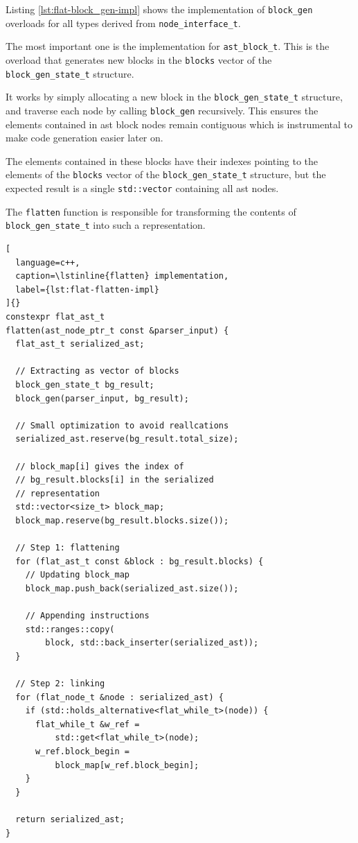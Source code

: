 \documentclass[../main]{subfiles}
\begin{document}
Listing \ref{lst:flat-block_gen-impl} shows the implementation of
\lstinline{block_gen} overloads for all types derived from
\lstinline{node_interface_t}.

The most important one is the implementation for \lstinline{ast_block_t}.
This is the overload that generates new blocks in the \lstinline{blocks} vector
of the \lstinline{block_gen_state_t} structure.

It works by simply allocating a new block in the \lstinline{block_gen_state_t}
structure, and traverse each node by calling \lstinline{block_gen} recursively.
This ensures the elements contained in \gls{ast} block nodes remain contiguous
which is instrumental to make code generation easier later on.

The elements contained in these blocks have their indexes pointing to
the elements of the \lstinline{blocks} vector
of the \lstinline{block_gen_state_t} structure, but the expected result is a
single \lstinline{std::vector} containing all \gls{ast} nodes.

The \lstinline{flatten} function is responsible for transforming the
contents of \lstinline{block_gen_state_t} into such a representation.

\begin{lstlisting}[
  language=c++,
  caption=\lstinline{flatten} implementation,
  label={lst:flat-flatten-impl}
]{}
constexpr flat_ast_t
flatten(ast_node_ptr_t const &parser_input) {
  flat_ast_t serialized_ast;

  // Extracting as vector of blocks
  block_gen_state_t bg_result;
  block_gen(parser_input, bg_result);

  // Small optimization to avoid reallcations
  serialized_ast.reserve(bg_result.total_size);

  // block_map[i] gives the index of
  // bg_result.blocks[i] in the serialized
  // representation
  std::vector<size_t> block_map;
  block_map.reserve(bg_result.blocks.size());

  // Step 1: flattening
  for (flat_ast_t const &block : bg_result.blocks) {
    // Updating block_map
    block_map.push_back(serialized_ast.size());

    // Appending instructions
    std::ranges::copy(
        block, std::back_inserter(serialized_ast));
  }

  // Step 2: linking
  for (flat_node_t &node : serialized_ast) {
    if (std::holds_alternative<flat_while_t>(node)) {
      flat_while_t &w_ref =
          std::get<flat_while_t>(node);
      w_ref.block_begin =
          block_map[w_ref.block_begin];
    }
  }

  return serialized_ast;
}
\end{lstlisting}
\end{document}
